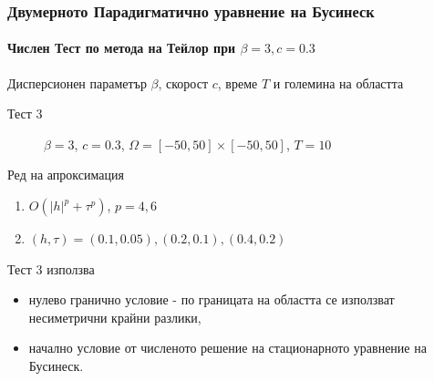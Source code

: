 \documentclass{beamer}
\begin{document}

\begin{frame}
\frametitle{Двумерното Парадигматично уравнение на Бусинеск}
\framesubtitle{Числен Тест по метода на Тейлор при $\beta = 3, c=0.3$}

Дисперсионен параметър $\beta$, скорост $c$, време $T$ и големина на областта
\begin{description}
 \item[Тест 3] $\beta = 3$, $c = 0.3$, $\Omega = [-50, 50] \times [-50, 50]$, $T = 10$
\end{description}

Ред на апроксимация
\begin{enumerate}
  \item $O(|h|^p + \tau^p)$, $p = 4, 6$
  \item $(h, \tau)=(0.1, 0.05), (0.2, 0.1), (0.4, 0.2)$
\end{enumerate}

Тест 3 използва 
\begin{itemize} 
\item нулево гранично условие - по границата на областта се използват несиметрични крайни разлики,
\item начално условие от численото решение на стационарното уравнение на Бусинеск.
\end{itemize}
\end{frame}
\end{document}
